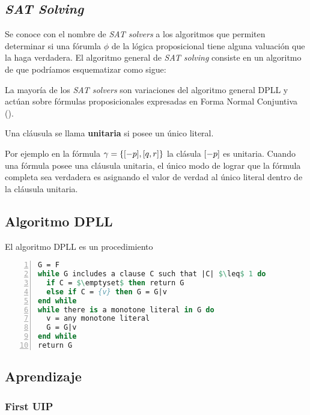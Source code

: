 \subsection{\emph{SAT Solving}}

Se conoce con el nombre de \emph{SAT solvers} a los algoritmos que permiten
determinar si una fórumla $\phi$ de la lógica proposicional tiene alguna
valuación que la haga verdadera. El algoritmo general de  \emph{SAT solving}
consiste en un algoritmo de \bt que podríamos esquematizar como sigue:


La mayoría de los \emph{SAT solvers} son
variaciones del algoritmo general
DPLL\cite{Davis:1962:MPT:368273.368557} y actúan sobre fórmulas
proposicionales expresadas en Forma Normal Conjuntiva (\cnf).



\begin{definition} 
 Una cláusula se llama \textbf{unitaria} si
posee un único literal.
\end{definition}
Por ejemplo
en la fórmula $\gamma = \{[-p], [q, r]\}$ la clásula $[-p]$ es
unitaria. Cuando una fórmula \cnf posee una cláusula unitaria, el único modo de
lograr que la fórmula completa sea verdadera es asignando el valor de verdad
\true al único literal dentro de la cláusula unitaria.

\subsection{Algoritmo DPLL}

El algoritmo DPLL es un procedimiento 

\begin{lstlisting}[mathescape,language=Pascal,frame=single,numbers=left,caption={Algoritmo
DPLL}] G = F
while G includes a clause C such that |C| $\leq$ 1 do
  if C = $\emptyset$ then return G
  else if C = {v} then G = G|v
end while
while there is a monotone literal in G do
  v = any monotone literal
  G = G|v
end while
return G
\end{lstlisting}

\subsection{Aprendizaje}
\subsubsection{First UIP}
